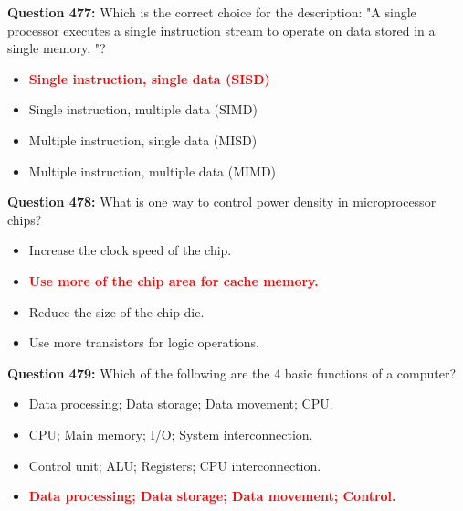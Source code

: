 \documentclass[12pt,a4paper]{article}
\begin{document}
\vspace{0.5cm}

\textbf{Question 477:} Which is the correct choice for the description: "A single processor executes a single instruction stream to operate on data stored in a single memory. "?

\begin{itemize}
    \item[\textbf{A.}] \textcolor{red}{\textbf{Single instruction, single data (SISD)}}
    \item[\textbf{B.}] Single instruction, multiple data (SIMD)
    \item[\textbf{C.}] Multiple instruction, single data (MISD)
    \item[\textbf{D.}] Multiple instruction, multiple data (MIMD)
\end{itemize}

\vspace{0.5cm}

\textbf{Question 478:} What is one way to control power density in microprocessor chips?

\begin{itemize}
    \item[\textbf{A.}] Increase the clock speed of the chip.
    \item[\textbf{B.}] \textcolor{red}{\textbf{Use more of the chip area for cache memory.}}
    \item[\textbf{C.}] Reduce the size of the chip die.
    \item[\textbf{D.}] Use more transistors for logic operations.
\end{itemize}

\vspace{0.5cm}

\textbf{Question 479:} Which of the following are the 4 basic functions of a computer?

\begin{itemize}
    \item[\textbf{A.}] Data processing; Data storage; Data movement; CPU.
    \item[\textbf{B.}] CPU; Main memory; I/O; System interconnection.
    \item[\textbf{C.}] Control unit; ALU; Registers; CPU interconnection.
    \item[\textbf{D.}] \textcolor{red}{\textbf{Data processing; Data storage; Data movement; Control.}}
\end{itemize}

\vspace{0.5cm}
\end{document}
